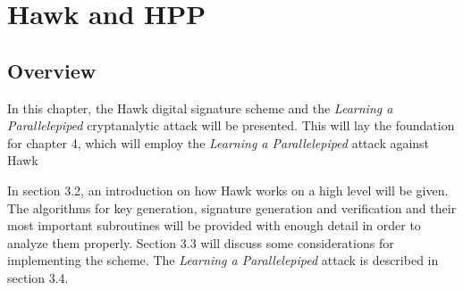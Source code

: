 \chapter{Hawk and HPP}
\section{Overview}
In this chapter, the Hawk digital signature scheme and the \textit{Learning a Parallelepiped} cryptanalytic attack will be presented.
This will lay the foundation for chapter 4, which will employ the \textit{Learning a Parallelepiped} attack against Hawk

In section 3.2, an introduction on how Hawk works on a high level will be given. The algorithms for key generation, signature 
generation and verification and their most important subroutines will be provided with enough detail in order to analyze them properly.
Section 3.3 will discuss some considerations for implementing the scheme.
The \textit{Learning a Parallelepiped} attack is described in section 3.4.

